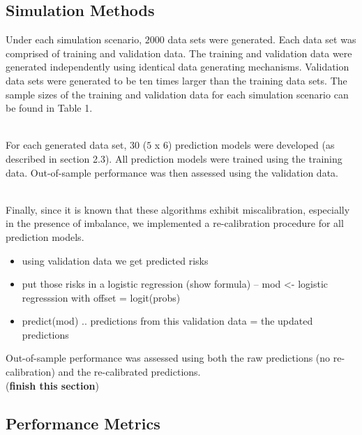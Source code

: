 \documentclass[AMA,STIX1COL,]{WileyNJD-v2}
\providecommand{\tightlist}{%
  \setlength{\itemsep}{0pt}\setlength{\parskip}{0pt}}
\begin{document}
\hypertarget{simulation-methods}{%
\subsection{Simulation Methods}\label{simulation-methods}}

Under each simulation scenario, \(2000\) data sets were generated. Each
data set was comprised of training and validation data. The training and
validation data were generated independently using identical data
generating mechanisms. Validation data sets were generated to be ten
times larger than the training data sets. The sample sizes of the
training and validation data for each simulation scenario can be found
in Table 1.\\
\strut \\
For each generated data set, 30 (\(5\) x \(6\)) prediction models were
developed (as described in section 2.3). All prediction models were
trained using the training data. Out-of-sample performance was then
assessed using the validation data.\\
\strut \\
Finally, since it is known that these algorithms exhibit miscalibration,
especially in the presence of imbalance, we implemented a re-calibration
procedure for all prediction models.

\begin{itemize}
\tightlist
\item
  using validation data we get predicted risks
\item
  put those risks in a logistic regression (show formula) -- mod
  \textless- logistic regresssion with offset = logit(probs)
\item
  predict(mod) .. predictions from this validation data = the updated
  predictions
\end{itemize}

Out-of-sample performance was assessed using both the raw predictions
(no re-calibration) and the re-calibrated predictions.\\
(\textbf{finish this section})

\hypertarget{performance-metrics}{%
\subsection{Performance Metrics}\label{performance-metrics}}
\end{document}

